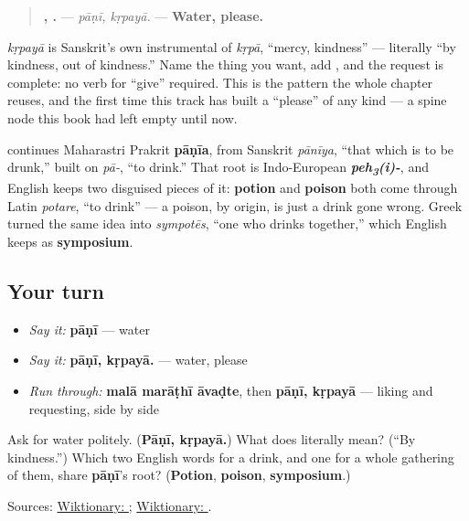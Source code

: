\begin{grammarlens}[title={Grammar Lens: asking politely}]
\begin{quote}
\textbf{, .} — \emph{pāṇī, kṛpayā.} — \textbf{Water, please.}
\end{quote}

\textbf{} \emph{kṛpayā} is Sanskrit's own instrumental of \textbf{} \emph{kṛpā}, \textquotedblleft{}mercy, kindness\textquotedblright{} — literally \textquotedblleft{}by kindness, out of kindness.\textquotedblright{} Name the thing you want, add \textbf{}, and the request is complete: no verb for \textquotedblleft{}give\textquotedblright{} required. This is the pattern the whole chapter reuses, and the first time this track has built a \textquotedblleft{}please\textquotedblright{} of any kind — a spine node this book had left empty until now.
\end{grammarlens}

\begin{cousinweb}
\textbf{} continues Maharastri Prakrit \textbf{pāṇīa}, from Sanskrit \textbf{} \emph{pānīya}, \textquotedblleft{}that which is to be drunk,\textquotedblright{} built on \textbf{} \emph{pā-}, \textquotedblleft{}to drink.\textquotedblright{} That root is Indo-European \emph{\textbf{peh\textsubscript{3}(i)-}}, and English keeps two disguised pieces of it: \textbf{potion} and \textbf{poison} both come through Latin \emph{potare}, \textquotedblleft{}to drink\textquotedblright{} — a poison, by origin, is just a drink gone wrong. Greek turned the same idea into \emph{sympotēs}, \textquotedblleft{}one who drinks together,\textquotedblright{} which English keeps as \textbf{symposium}.
\end{cousinweb}

\subsection*{Your turn}
\begin{itemize}
\raggedright
  \item \emph{Say it:} \textbf{pāṇī} — water
  \item \emph{Say it:} \textbf{pāṇī, kṛpayā.} — water, please
  \item \emph{Run through:} \textbf{malā marāṭhī āvaḍte}, then \textbf{pāṇī, kṛpayā} — liking and requesting, side by side
\end{itemize}

\begin{tcolorbox}[breakable,colback=teal!4,colframe=teal!35!black,title={Before you move on}]
Ask for water politely. (\textbf{Pāṇī, kṛpayā.}) What does \textbf{} literally mean? (\textquotedblleft{}By kindness.\textquotedblright{}) Which two English words for a drink, and one for a whole gathering of them, share \textbf{pāṇī}'s root? (\textbf{Potion}, \textbf{poison}, \textbf{symposium}.)

Sources: \href{https://en.wiktionary.org/wiki/\%E0\%A4\%AA\%E0\%A4\%BE\%E0\%A4\%A3\%E0\%A5\%80}{Wiktionary: }; \href{https://en.wiktionary.org/wiki/\%E0\%A4\%95\%E0\%A5\%83\%E0\%A4\%AA\%E0\%A4\%AF\%E0\%A4\%BE}{Wiktionary: }.
\end{tcolorbox}
